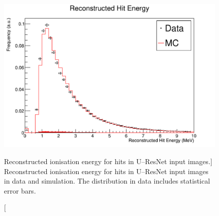 \begin{figure}
	\centering
	\includegraphics[width=\textwidth]{figures/hit_ion_reco.pdf}
	\caption
	[Reconstructed ionisation energy for hits in U--ResNet input images.]
	{Reconstructed ionisation energy for hits in U--ResNet input images
	in data and simulation. The distribution in data includes statistical error
	bars.}
	\label{fig:hit_ion_reco}
\end{figure}

